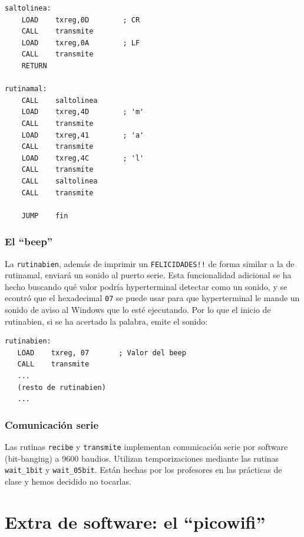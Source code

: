 \documentclass[a4paper, 12pt]{report}
\begin{document}
\begin{lstlisting}[caption={Rutinas saltolinea y rurinamal}]
saltolinea:
    LOAD    txreg,0D        ; CR
    CALL    transmite
    LOAD    txreg,0A        ; LF
    CALL    transmite
    RETURN

rutinamal:
    CALL    saltolinea
    LOAD    txreg,4D        ; 'm'
    CALL    transmite
    LOAD    txreg,41        ; 'a'
    CALL    transmite
    LOAD    txreg,4C        ; 'l'
    CALL    transmite
    CALL    saltolinea
    CALL    transmite

    JUMP    fin
\end{lstlisting}

\subsection{El ``beep''}
La \texttt{rutinabien}, además de imprimir un \texttt{FELICIDADES!!} de forma similar a la de rutinamal, enviará un sonido al puerto serie. Esta funcionalidad adicional se ha hecho buscando qué valor podría hyperterminal detectar como un sonido, y se econtró que el hexadecimal \texttt{07} se puede usar para que hyperterminal le mande un sonido de aviso al Windows que lo esté ejecutando. Por lo que el inicio de rutinabien, si se ha acertado la palabra, emite el sonido:


\begin{lstlisting}[caption={Emitir sonido mediante ASM}]
rutinabien:
   LOAD    txreg, 07       ; Valor del beep
   CALL    transmite
   ...
   (resto de rutinabien)
   ...
\end{lstlisting}

\subsection{Comunicación serie}

Las rutinas \texttt{recibe} y \texttt{transmite} implementan comunicación serie por software (bit-banging) a 9600 baudios. Utilizan temporizaciones mediante las rutinas \texttt{wait\_1bit} y \texttt{wait\_05bit}. Están hechas por los profesores en las prácticas de clase y hemos decidido no tocarlas.

\chapter{Extra de software: el ``picowifi''}
\end{document}
